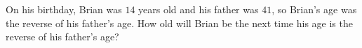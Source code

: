 On his birthday, Brian was $14$ years old and his father was $41$, so Brian's age was the reverse of his father's age. How old will Brian be the next time his age is the reverse of his father's age?
